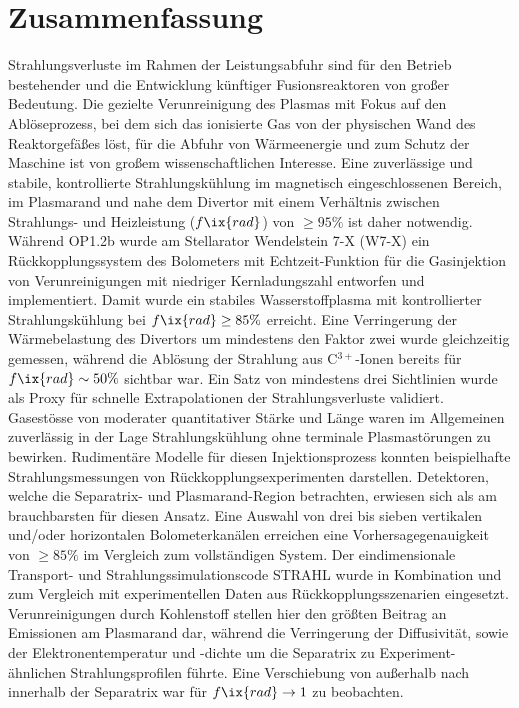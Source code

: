 
\checkoddpage\ifoddpage\clearpage\else\cleardoublepage\fi%

    \chapter*{Zusammenfassung}%

        Strahlungsverluste im Rahmen der Leistungsabfuhr sind für den Betrieb bestehender und die Entwicklung künftiger Fusionsreaktoren von großer Bedeutung. Die gezielte Verunreinigung des Plasmas mit Fokus auf den Ablöseprozess, bei dem sich das ionisierte Gas von der physischen Wand des Reaktorgefäßes löst, für die Abfuhr von Wärmeenergie und zum Schutz der Maschine ist von großem wissenschaftlichen Interesse. Eine zuverlässige und stabile, kontrollierte Strahlungskühlung im magnetisch eingeschlossenen Bereich, im Plasmarand und nahe dem Divertor mit einem Verhältnis zwischen Strahlungs- und Heizleistung ($f\ix{rad}$) von $\ge95\%$ ist daher notwendig.\\%
        Während OP1.2b wurde am Stellarator Wendelstein 7-X (W7-X) ein Rückkopplungssystem des Bolometers mit Echtzeit-Funktion für die Gasinjektion von Verunreinigungen mit niedriger Kernladungszahl entworfen und implementiert. Damit wurde ein stabiles Wasserstoffplasma mit kontrollierter Strahlungskühlung bei $f\ix{rad}\ge85\%$ erreicht. Eine Verringerung der Wärmebelastung des Divertors um mindestens den Faktor zwei wurde gleichzeitig gemessen, während die Ablösung der Strahlung aus C$^{3+}$-Ionen bereits für $f\ix{rad}\sim50\%$ sichtbar war. Ein Satz von mindestens drei Sichtlinien wurde als Proxy für schnelle Extrapolationen der Strahlungsverluste validiert.\\%
        Gasestösse von moderater quantitativer Stärke und Länge waren im Allgemeinen zuverlässig in der Lage Strahlungskühlung ohne terminale Plasmastörungen zu bewirken. Rudimentäre Modelle für diesen Injektionsprozess konnten beispielhafte Strahlungsmessungen von Rückkopplungsexperimenten darstellen. Detektoren, welche die Separatrix- und Plasmarand-Region betrachten, erwiesen sich als am brauchbarsten für diesen Ansatz. Eine Auswahl von drei bis sieben vertikalen und/oder horizontalen Bolometerkanälen erreichen eine Vorhersagegenauigkeit von $\ge85\%$ im Vergleich zum vollständigen System. Der eindimensionale Transport- und Strahlungssimulationscode STRAHL wurde in Kombination und zum Vergleich mit experimentellen Daten aus Rückkopplungsszenarien eingesetzt. Verunreinigungen durch Kohlenstoff stellen hier den größten Beitrag an Emissionen am Plasmarand dar, während die Verringerung der Diffusivität, sowie der Elektronentemperatur und -dichte um die Separatrix zu Experiment-ähnlichen Strahlungsprofilen führte. Eine Verschiebung von außerhalb nach innerhalb der Separatrix war für $f\ix{rad}\rightarrow1$ zu beobachten.\\%
